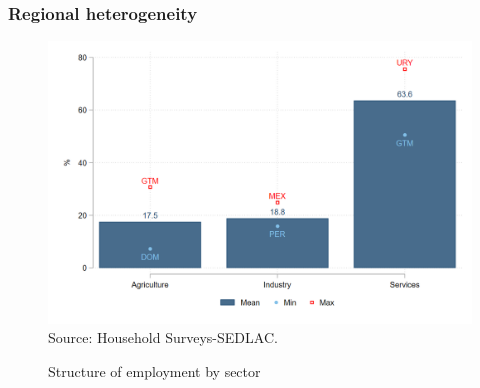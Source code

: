 \documentclass{beamer}
\begin{document}
\begin{frame}
\frametitle{Regional heterogeneity}
\begin{figure}[!htb]
        \justifying
        \caption{Structure of employment by sector}     
        \includegraphics[width=0.8\linewidth]{latex/figures/Snapshot/Structure of employment and sector.png}
        \label{fig:sector}
        \centering
       \footnotesize{Source: Household Surveys-SEDLAC.}

\end{figure}
\end{frame}
\end{document}
